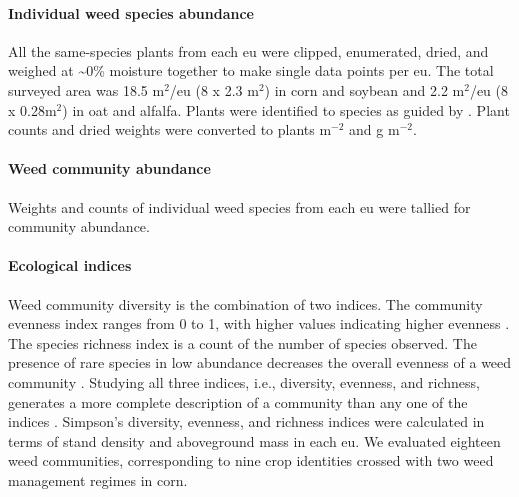 \documentclass[
]{article}
\begin{document}
\hypertarget{individual-weed-species-abundance}{%
\paragraph*{Individual weed species abundance}\label{individual-weed-species-abundance}}

All the same-species plants from each eu were clipped, enumerated, dried, and weighed at \textasciitilde0\% moisture together to make single data points per eu. The total surveyed area was 18.5 m\(^2\)/eu (8 x 2.3 m\(^2\)) in corn and soybean and 2.2 m\(^2\)/eu (8 x 0.28m\(^2\)) in oat and alfalfa. Plants were identified to species as guided by \citet{uvaWeedsNortheast1997}. Plant counts and dried weights were converted to plants m\(^{-2}\) and g m\(^{-2}\).

\hypertarget{weed-community-abundance}{%
\paragraph*{Weed community abundance}\label{weed-community-abundance}}

Weights and counts of individual weed species from each eu were tallied for community abundance.

\hypertarget{ecological-indices}{%
\paragraph*{Ecological indices}\label{ecological-indices}}

Weed community diversity is the combination of two indices. The community evenness index ranges from 0 to 1, with higher values indicating higher evenness \citep{alataloProblemsMeasurementEvenness1981}. The species richness index is a count of the number of species observed. The presence of rare species in low abundance decreases the overall evenness of a weed community \citep{pielouInterpretationEcologicalData1984, stirlingEmpiricalRelationshipsSpecies2001}. Studying all three indices, i.e., diversity, evenness, and richness, generates a more complete description of a community than any one of the indices \citep{morrisChoosingUsingDiversity2014}. Simpson's diversity, evenness, and richness indices were calculated in terms of stand density and aboveground mass in each eu. We evaluated eighteen weed communities, corresponding to nine crop identities crossed with two weed management regimes in corn.
\end{document}
